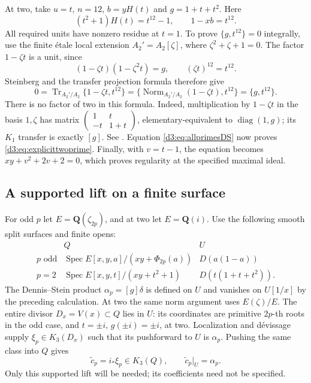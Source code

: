 \documentclass[11pt,a4paper]{amsart}
\numberwithin{equation}{section}
\theoremstyle{definition}
\theoremstyle{remark}
\newcommand{\Q}{\mathbf Q}
\newcommand{\Spec}{\operatorname{Spec}}
\begin{document}
At two, take $u=t$, $n=12$, $b=yH(t)$ and $g=1+t+t^2$.
Here
\[
 (t^2+1)H(t)=t^{12}-1,\qquad 1-xb=t^{12}.
\]
All required units have nonzero residue at $t=1$. To prove
$\{g,t^{12}\}=0$ integrally, use the finite \'etale local extension
$A_2'=A_2[\zeta]$, where $\zeta^2+\zeta+1=0$.
The factor $1-\zeta t$ is a unit, since
\[
 (1-\zeta t)(1-\zeta^2t)=g,
 \qquad (\zeta t)^{12}=t^{12}.
\]
Steinberg and the transfer projection formula therefore give
\[
 0=\operatorname{Tr}_{A_2'/A_2}
       \{1-\zeta t,t^{12}\}
   =\{\operatorname{Norm}_{A_2'/A_2}(1-\zeta t),t^{12}\}
   =\{g,t^{12}\}.
\]
There is no factor of two in this formula. Indeed, multiplication by
$1-\zeta t$ in the basis $1,\zeta$ has matrix
$\left(\begin{smallmatrix}1&t\\-t&1+t\end{smallmatrix}\right)$,
elementary-equivalent to $\operatorname{diag}(1,g)$; its $K_1$ transfer is exactly $[g]$.
See \cite[Chapter~III, Definition~5.11 and relations (D1)--(D3)]{Weibel}.
Equation \eqref{d3:eq:allprimesDS} now proves \eqref{d3:eq:explicittwoprime}.
Finally, with $v=t-1$, the equation becomes
$xy+v^2+2v+2=0$, which proves regularity at the specified maximal ideal.

\subsection{A supported lift on a finite surface}

For odd $p$ let $E=\Q(\zeta_{2p})$, and at two let $E=\Q(i)$.
Use the following smooth split surfaces and finite opens:
\[
\begin{array}{c|c|c}
 & Q & U\\ \hline
p\text{ odd}
 & \Spec E[x,y,a]/(xy+\Phi_{2p}(a))
 & D(a(1-a))\\
p=2
 & \Spec E[x,y,t]/(xy+t^2+1)
 & D(t(1+t+t^2)).
\end{array}
\]
The Dennis--Stein product $\alpha_p=[g]\delta$ is defined on $U$
and vanishes on $U[1/x]$ by the preceding calculation.
At two the same norm argument uses $E(\zeta)/E$.
The entire divisor $D_x=V(x)\subset Q$ lies in $U$:
its coordinates are primitive $2p$-th roots in the odd case, and
$t=\pm i$, $g(\pm i)=\pm i$, at two.
Localization and d\'evissage supply $\xi_p\in K_3(D_x)$ such that its
pushforward to $U$ is $\alpha_p$. Pushing the same class into $Q$ gives
\begin{equation}\label{d3:eq:allprimeslift}
 \widetilde c_p=i_*\xi_p\in K_3(Q),
 \qquad \widetilde c_p|_U=\alpha_p.
\end{equation}
Only this supported lift will be needed; its coefficients need not be specified.
\end{document}
